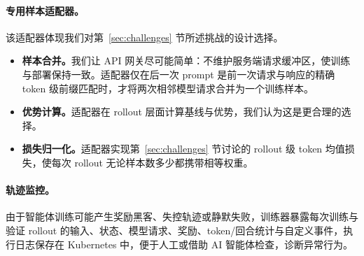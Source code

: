 \paragraph{专用样本适配器。}
该适配器体现我们对第~\ref{sec:challenges} 节所述挑战的设计选择。
\begin{itemize}
	\item \textbf{样本合并。}我们让 API 网关尽可能简单：不维护服务端请求缓冲区，使训练与部署保持一致。适配器仅在后一次 prompt 是前一次请求与响应的精确 token 级前缀匹配时，才将两次相邻模型请求合并为一个训练样本。
	\item \textbf{优势计算。}适配器在 rollout 层面计算基线与优势，我们认为这是更合理的选择。
	\item \textbf{损失归一化。}适配器实现第~\ref{sec:challenges} 节讨论的 rollout 级 token 均值损失，使每次 rollout 无论样本数多少都携带相等权重。
\end{itemize}

\paragraph{轨迹监控。}
由于智能体训练可能产生奖励黑客、失控轨迹或静默失败，训练器暴露每次训练与验证 rollout 的输入、状态、模型请求、奖励、token/回合统计与自定义事件，执行日志保存在 Kubernetes 中，便于人工或借助 AI 智能体检查，诊断异常行为。
